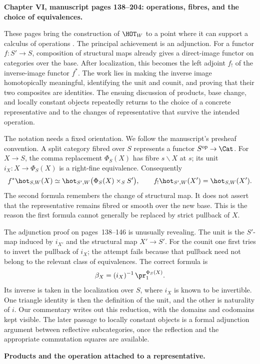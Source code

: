 \noindent\textbf{Chapter VI, manuscript pages 138--204: operations, fibres, and the choice of equivalences.}

These pages bring the construction of $\HOT_W$ to a point where it can support a calculus of operations \citep{Grothendieck1990VI}. The principal achievement is an adjunction. For a functor $f:S'\to S$, composition of structural maps already gives a direct-image functor on categories over the base. After localization, this becomes the left adjoint $f_!$ of the inverse-image functor $f^*$. The work lies in making the inverse image homotopically meaningful, identifying the unit and counit, and proving that their two composites are identities. The ensuing discussion of products, base change, and locally constant objects repeatedly returns to the choice of a concrete representative and to the changes of representative that survive the intended operation.

The notation needs a fixed orientation. We follow the manuscript's presheaf convention. A split category fibred over $S$ represents a functor $S^{\mathrm{op}}\to\Cat$. For $X\to S$, the comma replacement $\Phi_S(X)$ has fibre $s\backslash X$ at $s$; its unit $i_X:X\to\Phi_S(X)$ is a right-fine equivalence. Consequently
\[
 f^*\hot_{S,W}(X)
 \simeq\hot_{S',W}\bigl(\Phi_S(X)\times_S S'\bigr),
 \qquad
 f_!\hot_{S',W}(X')=\hot_{S,W}(X').
\]
The second formula remembers the change of structural map. It does not assert that the representative remains fibred or smooth over the new base. This is the reason the first formula cannot generally be replaced by strict pullback of $X$.

The adjunction proof on pages~138--146 is unusually revealing. The unit is the $S'$-map induced by $i_{X'}$ and the structural map $X'\to S'$. For the counit one first tries to invert the pullback of $i_X$; the attempt fails because that pullback need not belong to the relevant class of equivalences. The correct formula is
\[
 \beta_X=(i_X)^{-1}\,\pr_1^{\Phi_S(X)}.
\]
Its inverse is taken in the localization over $S$, where $i_X$ is known to be invertible. One triangle identity is then the definition of the unit, and the other is naturality of $i$. Our commentary writes out this reduction, with the domains and codomains kept visible. The later passage to locally constant objects is a formal adjunction argument between reflective subcategories, once the reflection and the appropriate commutation squares are available.

\medskip\noindent\textbf{Products and the operation attached to a representative.}

